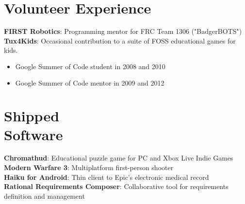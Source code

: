\documentclass[line,margin]{res}
\begin{document}
\begin{resume}
\section{\sc Volunteer Experience}          
    \textbf{FIRST Robotics}: Programming mentor for FRC Team 1306 ("BadgerBOTS") \\
    \textbf{Tux4Kids}: Occasional contribution to a suite of FOSS educational games for kids.
    \begin{itemize}
        \item Google Summer of Code student in 2008 and 2010 
        \item Google Summer of Code mentor in 2009 and 2012
    \end{itemize}

\section{\sc Shipped \\ Software}
    \textbf{Chromathud}: Educational puzzle game for PC and Xbox Live Indie Games \\
    \textbf{Modern Warfare 3}: Multiplatform first-person shooter \\
    \textbf{Haiku for Android}: Thin client to Epic's electronic medical record  \\
    \textbf{Rational Requirements Composer}: Collaborative tool for requirements definition and management
 
\end{resume}
\end{document}
